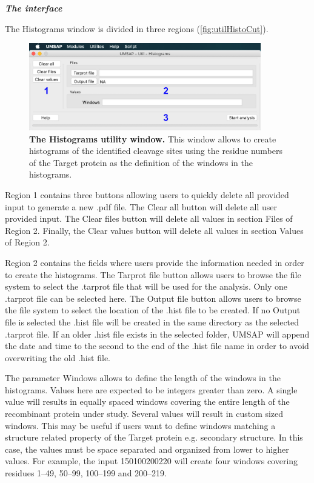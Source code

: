 \textit{\textbf{The interface}}

The Histograms window is divided in three regions (\autoref{fig:utilHistoCut}).

\begin{figure}[h]
	\centering
	\includegraphics[width=0.9\textwidth]{./IMAGES/UTIL-HIST-WINDOW/util-histo.jpg}	    
	\caption[The Histograms utility window]{\textbf{The Histograms utility window.} This window allows to create histograms of the identified cleavage sites using the residue numbers of the Target protein as the definition of the windows in the histograms.} 
	\label{fig:utilHistoCut}
	\vspace{-5pt} 	
\end{figure}

Region \num{1} contains three buttons allowing users to quickly delete all provided input to generate a new .pdf file. The Clear all button will delete all user provided input. The Clear files button will delete all values in section Files of Region \num{2}. Finally, the Clear values button will delete all values in section Values of Region \num{2}.

Region \num{2} contains the fields where users provide the information needed in order to create the histograms. The Tarprot file button allows users to browse the file system to select the .tarprot file that will be used for the analysis. Only one .tarprot file can be selected here. The Output file button allows users to browse the file system to select the location of the .hist file to be created. If no Output file is selected the .hist file will be created in the same directory as the selected .tarprot file. If an older .hist file exists in the selected folder, UMSAP will append the date and time to the second to the end of the .hist file name in order to avoid overwriting the old .hist file. 

The parameter Windows allows to define the length of the windows in the histograms. Values here are expected to be integers greater than zero. A single value will results in equally spaced windows covering the entire length of the recombinant protein under study. Several values will result in custom sized windows. This may be useful if users want to define windows matching a structure related property of the Target protein e.g. secondary structure. In this case, the values must be space separated and organized from lower to higher values. For example, the input \numlist{1 50 100 200 220} will create four windows covering residues \numrange{1}{49}, \numrange{50}{99}, \numrange{100}{199} and \numrange{200}{219}.

